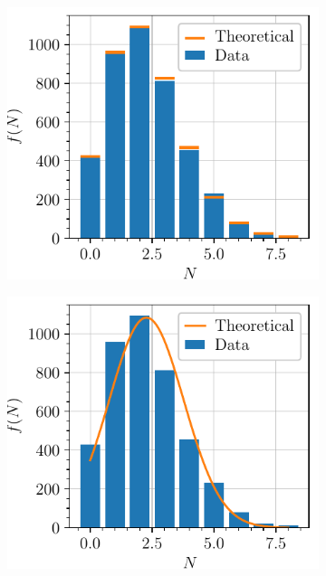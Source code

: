 \begin{figure}[htbp]
    \centering
    \begin{subfigure}{0.495\textwidth}
        \includegraphics[scale=1]{figures/lowmean_poisson.pdf}
    \end{subfigure}
    \begin{subfigure}{0.495\textwidth}
        \includegraphics[scale=1]{figures/lowmean_gaussian.pdf}
    \end{subfigure}
    \begin{subfigure}{0.495\textwidth}

\end{subfigure}
\end{figure}
